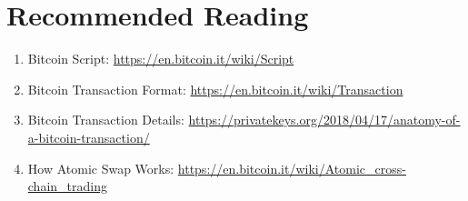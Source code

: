 \documentclass[11pt]{article}
\begin{document}
\section{Recommended Reading}
\label{sec:rreading}
\begin{enumerate}
  \item \label{reference:bscript}Bitcoin Script:
  \href{https://en.bitcoin.it/wiki/Script}{https://en.bitcoin.it/wiki/Script}
  \item Bitcoin Transaction Format:
  \href{https://en.bitcoin.it/wiki/Transaction}{https://en.bitcoin.it/wiki/Transaction}
  \item Bitcoin Transaction Details:
  \href{https://privatekeys.org/2018/04/17/anatomy-of-a-bitcoin-transaction/}{https://privatekeys.org/2018/04/17/anatomy-of-a-bitcoin-transaction/}
  \item How Atomic Swap Works: \href{https://en.bitcoin.it/wiki/Atomic\_cross-chain\_trading}{https://en.bitcoin.it/wiki/Atomic\_cross-chain\_trading}
\end{enumerate}
\end{document}
